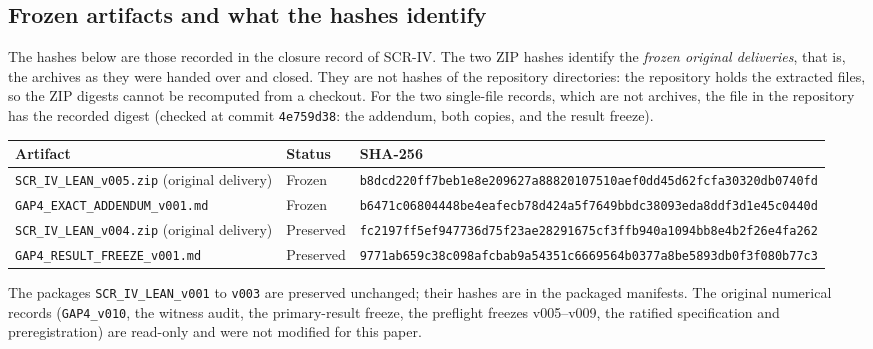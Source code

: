 \documentclass[11pt,a4paper]{article}
\theoremstyle{plain}
\theoremstyle{definition}
\theoremstyle{remark}
\newcommand{\lean}[1]{\nolinkurl{#1}}
\begin{document}
\subsection{Frozen artifacts and what the hashes identify}
The hashes below are those recorded in the closure record of SCR-IV. The two ZIP hashes identify the \emph{frozen original deliveries}, that is, the archives as they were handed over and closed. They are not hashes of the repository directories: the repository holds the extracted files, so the ZIP digests cannot be recomputed from a checkout. For the two single-file records, which are not archives, the file in the repository has the recorded digest (checked at commit \texttt{4e759d38}: the addendum, both copies, and the result freeze).

\begin{center}\small
\begin{tabularx}{\linewidth}{@{}p{4.3cm}p{1.6cm}X@{}}
\toprule
Artifact & Status & SHA-256\\
\midrule
\lean{SCR_IV_LEAN_v005.zip} (original delivery) & Frozen & \texttt{b8dcd220ff7beb1e8e209627a8882010}\newline\texttt{7510aef0dd45d62fcfa30320db0740fd}\\
\lean{GAP4_EXACT_ADDENDUM_v001.md} & Frozen & \texttt{b6471c06804448be4eafecb78d424a5f}\newline\texttt{7649bbdc38093eda8ddf3d1e45c0440d}\\
\lean{SCR_IV_LEAN_v004.zip} (original delivery) & Preserved & \texttt{fc2197ff5ef947736d75f23ae2829167}\newline\texttt{5cf3ffb940a1094bb8e4b2f26e4fa262}\\
\lean{GAP4_RESULT_FREEZE_v001.md} & Preserved & \texttt{9771ab659c38c098afcbab9a54351c66}\newline\texttt{69564b0377a8be5893db0f3f080b77c3}\\
\bottomrule
\end{tabularx}
\end{center}
The packages \lean{SCR_IV_LEAN_v001} to \lean{v003} are preserved unchanged; their hashes are in the packaged manifests. The original numerical records (\lean{GAP4_v010}, the witness audit, the primary-result freeze, the preflight freezes v005--v009, the ratified specification and preregistration) are read-only and were not modified for this paper.
\end{document}
